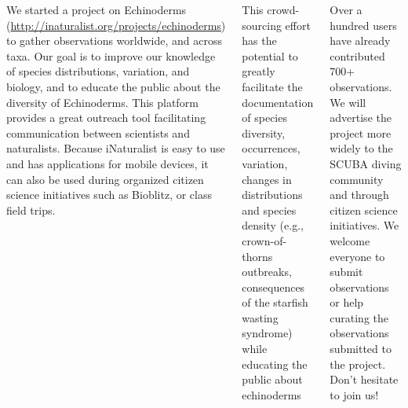 \documentclass[46pt, nnermargin=7mm, blockverticalspace=7mm, colspace=7mm]{tikzposter}\usepackage[]{graphicx}\usepackage[]{color}
\begin{document}
\begin{columns}
{  \vspace{.5cm}

  We started a project on Echinoderms
  (\href{http://inaturalist.org/projects/echinoderms}{http://inaturalist.org/projects/echinoderms})
  to gather observations worldwide, and across taxa. Our goal is to improve our
  knowledge of species distributions, variation, and biology, and to educate the
  public about the diversity of Echinoderms. This platform provides a great
  outreach tool facilitating communication between scientists and
  naturalists. Because iNaturalist is easy to use and has applications for
  mobile devices, it can also be used during organized citizen science
  initiatives such as Bioblitz, or class field trips.

  \vspace{.5cm}

  This crowd-sourcing effort has the potential to greatly facilitate the
  documentation of species diversity, occurrences, variation, changes in
  distributions and species density (e.g., crown-of-thorns outbreaks,
  consequences of the starfish wasting syndrome) while educating the public
  about echinoderms

  \vspace{.5cm}

  Over a hundred users have already contributed 700+ observations. We will
  advertise the project more widely to the SCUBA diving community and through
  citizen science initiatives. We welcome everyone to submit observations or
  help curating the observations submitted to the project. Don't hesitate to
  join us!

}

\end{columns}
\end{document}
